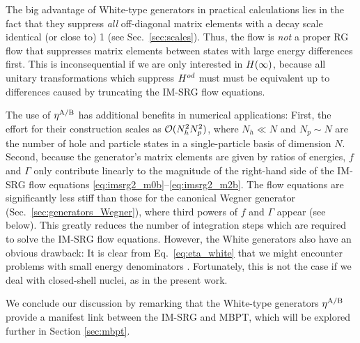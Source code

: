 The big advantage of White-type generators in practical calculations lies in the fact that they suppress \emph{all} off-diagonal matrix elements with a decay scale identical (or close to) 1 (see Sec.~\ref{sec:scales}). Thus, the flow is \emph{not} a proper RG flow that suppresses matrix elements between states with large energy differences first. This is inconsequential if we are only interested in $H(\infty)$, because all unitary transformations which suppress $H^{od}$ must must be equivalent up to differences caused by truncating the IM-SRG flow equations.

The use of $\eta^\text{A/B}$ has additional benefits in numerical applications: First, the effort for their construction scales as $\mathcal{O}(N_h^2N_p^2)$, where $N_h\ll N$ and $N_p\sim N$ are the number of hole and particle states in a single-particle basis of dimension $N$. Second, because the generator's matrix elements are given by ratios of energies, $f$ and $\Gamma$ only contribute linearly to the magnitude of the right-hand side of the IM-SRG flow equations \eqref{eq:imsrg2_m0b}--\eqref{eq:imsrg2_m2b}. The flow equations are significantly less stiff than those for the canonical Wegner generator (Sec.~\ref{sec:generators_Wegner}), where third powers of $f$ and $\Gamma$ appear (see below). This greatly reduces the number of integration steps which are required to solve the IM-SRG flow equations. However, the White generators also have an obvious drawback: It is clear from Eq.~\eqref{eq:eta_white} that we might encounter problems with small energy denominators \cite{Tsukiyama:2012fk,Hergert:2013ij}. Fortunately, this is not the case if we deal with closed-shell nuclei, as in the present work. 

We conclude our discussion by remarking that the White-type generators $\eta^\text{A/B}$ provide a manifest link between the IM-SRG and MBPT, which will be explored further in Section \ref{sec:mbpt}. 

